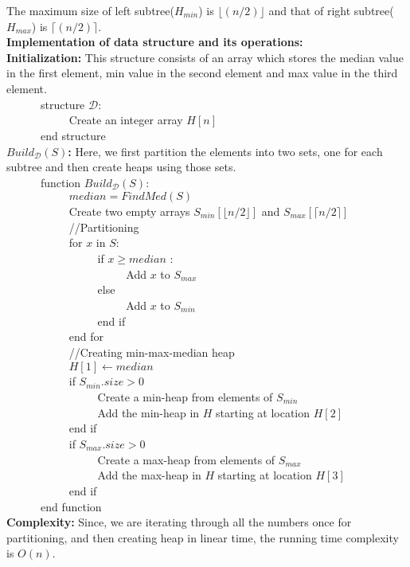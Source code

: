 \documentclass[12pt]{article}
\begin{document}
\begin{enumerate}
\begin{itemize}
\begin{enumerate}
\end{enumerate}
The maximum size of left subtree($H_{min}$) is $\lfloor (n/2)\rfloor$ and that of right subtree($H_{max}$) is $\lceil (n/2) \rceil$.\\
\textbf{Implementation of data structure and its operations:}\\
\textbf{Initialization:} This structure consists of an array which stores the median value in the first element, min value in the second element and max value in the third element.\\
\verb|		|structure $\mathcal{D}:$\\
\verb|		|\verb|		|Create an integer array $H[n]$\\
\pagebreak
\verb|		|end structure\\

\textbf{$Build_{\mathcal{D}}(S)$:} Here, we first partition the elements into two sets, one for each subtree and then create heaps using those sets.\\
\verb|		|function $Build_{\mathcal{D}}(S):$\\
\verb|		|\verb|		|$median = FindMed(S)$\\
\verb|		|\verb|		|Create two empty arrays $S_{min}[\lfloor n/2 \rfloor]$ and $S_{max}[\lceil n/2 \rceil]$\\
\verb|		|\verb|		|//Partitioning\\
\verb|		|\verb|		|for $x$ in $S$:\\
\verb|		|\verb|		|\verb|		|if $x \geq median$ :\\
\verb|		|\verb|		|\verb|		|\verb|		|Add $x$ to $S_{max}$\\
\verb|		|\verb|		|\verb|		|else\\
\verb|		|\verb|		|\verb|		|\verb|		|Add $x$ to $S_{min}$\\
\verb|		|\verb|		|\verb|		|end if\\
\verb|		|\verb|		|end for\\
\verb|		|\verb|		|//Creating min-max-median heap\\
\verb|		|\verb|		|$H[1] \leftarrow median$\\
\verb|		|\verb|		|if $S_{min}.size > 0 $\\
\verb|		|\verb|		|\verb|		|Create a min-heap from elements of $S_{min}$\\
\verb|		|\verb|		|\verb|		|Add the min-heap in $H$ starting at location $H[2]$\\
\verb|		|\verb|		|end if\\
\verb|		|\verb|		|if $S_{max}.size > 0 $\\
\verb|		|\verb|		|\verb|		|Create a max-heap from elements of $S_{max}$\\
\verb|		|\verb|		|\verb|		|Add the max-heap in $H$ starting at location $H[3]$\\
\verb|		|\verb|		|end if\\
\verb|		|end function\\
\textbf{Complexity:} Since, we are iterating through all the numbers once for partitioning,  and then creating heap in linear time, the running time complexity is $O(n)$.\\


\end{itemize}
\end{enumerate}
\end{document}
